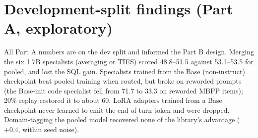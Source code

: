 \documentclass[11pt]{article}
\begin{document}
\section{Development-split findings (Part A, exploratory)}
\label{app:parta}
All Part A numbers are on the dev split and informed the Part B design. Merging the six 1.7B specialists (averaging
or TIES) scored 48.8--51.5 against 53.1--53.5 for pooled, and lost the SQL gain. Specialists trained from the Base
(non-instruct) checkpoint beat pooled training when routed, but broke on reworded prompts (the Base-init code
specialist fell from 71.7 to 33.3 on reworded MBPP items); 20\% replay restored it to about 60. LoRA adapters trained
from a Base checkpoint never learned to emit the end-of-turn token and were dropped. Domain-tagging the pooled model
recovered none of the library's advantage ($+0.4$, within seed noise).
\end{document}
